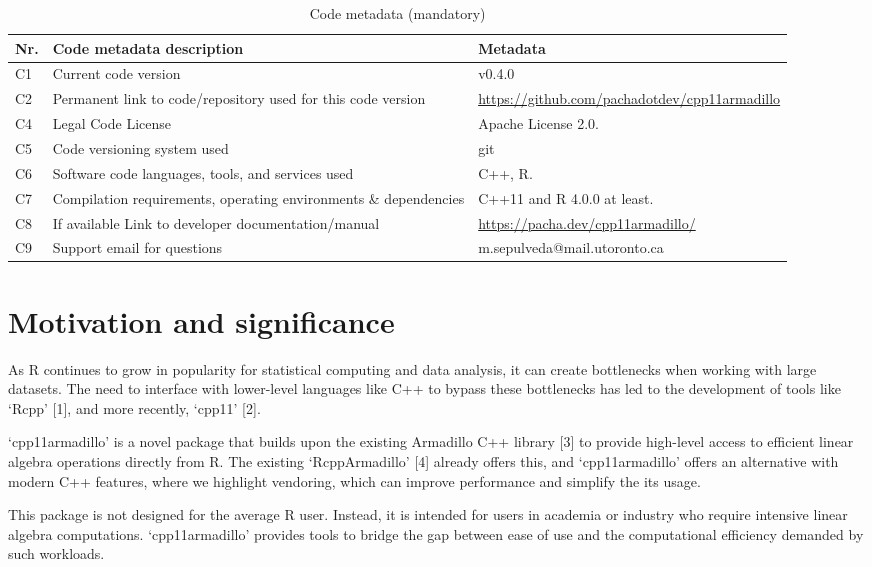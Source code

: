 \documentclass[preprint,12pt, a4paper]{elsarticle}
\begin{document}
\begin{table}[!h]
\begin{tabular}{|l|p{6.5cm}|p{6.5cm}|}
\hline
\textbf{Nr.} & \textbf{Code metadata description} & \textbf{Metadata} \\
\hline
C1 & Current code version & v0.4.0 \\
\hline
C2 & Permanent link to code/repository used for this code version & \url{https://github.com/pachadotdev/cpp11armadillo} \\
\hline
C4 & Legal Code License   & Apache License 2.0. \\
\hline
C5 & Code versioning system used & git \\
\hline
C6 & Software code languages, tools, and services used & C++, R. \\
\hline
C7 & Compilation requirements, operating environments \& dependencies & C++11 and R 4.0.0 at least. \\
\hline
C8 & If available Link to developer documentation/manual & \url{https://pacha.dev/cpp11armadillo/} \\
\hline
C9 & Support email for questions & m.sepulveda@mail.utoronto.ca \\
\hline
\end{tabular}
\caption{Code metadata (mandatory)}
\label{codeMetadata} 
\end{table}

\newpage

\section{Motivation and significance}\label{motivation-and-significance}

As R continues to grow in popularity for statistical computing and data
analysis, it can create bottlenecks when working with large datasets.
The need to interface with lower-level languages like C++ to bypass
these bottlenecks has led to the development of tools like `Rcpp'
{[}1{]}, and more recently, `cpp11' {[}2{]}.

`cpp11armadillo' is a novel package that builds upon the existing
Armadillo C++ library {[}3{]} to provide high-level access to efficient
linear algebra operations directly from R. The existing `RcppArmadillo'
{[}4{]} already offers this, and `cpp11armadillo' offers an alternative
with modern C++ features, where we highlight vendoring, which can
improve performance and simplify the its usage.

This package is not designed for the average R user. Instead, it is
intended for users in academia or industry who require intensive linear
algebra computations. `cpp11armadillo' provides tools to bridge the gap
between ease of use and the computational efficiency demanded by such
workloads.
\end{document}
